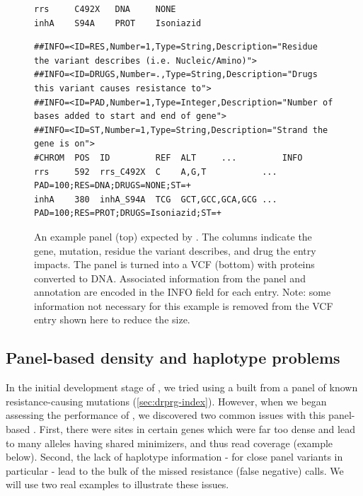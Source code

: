 \begin{figure}
\begin{Verbatim}[frame=single,framerule=0.5mm,label=Panel,fontsize=\footnotesize]
rrs     C492X   DNA     NONE
inhA    S94A    PROT    Isoniazid
\end{Verbatim}
\begin{Verbatim}[frame=single,framerule=0.5mm,label=VCF,fontsize=\footnotesize]
##INFO=<ID=RES,Number=1,Type=String,Description="Residue the variant describes (i.e. Nucleic/Amino)">
##INFO=<ID=DRUGS,Number=.,Type=String,Description="Drugs this variant causes resistance to">
##INFO=<ID=PAD,Number=1,Type=Integer,Description="Number of bases added to start and end of gene">
##INFO=<ID=ST,Number=1,Type=String,Description="Strand the gene is on">
#CHROM  POS  ID         REF  ALT     ...         INFO
rrs     592  rrs_C492X  C    A,G,T           ... PAD=100;RES=DNA;DRUGS=NONE;ST=+
inhA    380  inhA_S94A  TCG  GCT,GCC,GCA,GCG ... PAD=100;RES=PROT;DRUGS=Isoniazid;ST=+
\end{Verbatim}
\caption{An example panel (top) expected by \drprg{}. The columns indicate the gene, mutation, residue the variant describes, and drug the entry impacts. The panel is turned into a VCF (bottom) with proteins converted to DNA. Associated information from the panel and annotation are encoded in the INFO field for each entry. Note: some information not necessary for this example is removed from the VCF entry shown here to reduce the size.}
\label{fig:example-panel}
\end{figure}

\subsection{Panel-based \prg{} density and haplotype problems}
\label{app:panel-prg-issues}

In the initial development stage of \drprg{}, we tried using a \prg{} built from a panel of known resistance-causing mutations (\autoref{sec:drprg-index}). However, when we began assessing the performance of \drprg{}, we discovered two common issues with this panel-based \prg{}. First, there were sites in certain genes which were far too dense and lead to many alleles having shared minimizers, and thus read coverage (example below). Second, the lack of haplotype information - for close panel variants in particular - lead to the bulk of the missed resistance (false negative) calls. We will use two real examples to illustrate these issues.

